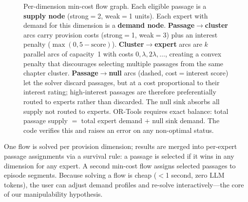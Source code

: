 \documentclass[final]{clv2025}
\begin{document}
\begin{figure}[t]
\caption{Per-dimension min-cost flow graph.  Each eligible passage is
  a \textbf{supply node} (strong${}={}$2, weak${}={}$1 units).  Each
  expert with demand for this dimension is a \textbf{demand node}.
  \textbf{Passage$\to$cluster} arcs carry provision costs
  (strong${}={}$1, weak${}={}$3) plus an interest penalty
  ($\max(0, 5 - \text{score})$).  \textbf{Cluster$\to$expert} arcs
  are $k$ parallel arcs of capacity~1 with costs $0, \lambda,
  2\lambda, \ldots$, creating a convex penalty that discourages
  selecting multiple passages from the same chapter cluster.
  \textbf{Passage$\to$null} arcs (dashed, cost${}={}$interest score)
  let the solver discard passages, but at a cost proportional to
  their interest rating; high-interest passages are therefore
  preferentially routed to experts rather than discarded.
  The null sink absorbs all supply not routed to experts.  OR-Tools requires exact balance: total
  passage supply $=$ total expert demand $+$ null sink demand.  The
  code verifies this and raises an error on any non-optimal status.}
\label{fig:flow}
\end{figure}

One flow is solved per provision dimension; results are merged into
per-expert passage assignments via a survival rule: a passage is
selected if it wins in any dimension for any expert.  A second
min-cost flow assigns selected passages to episode segments.  Because
solving a flow is cheap ($<$1 second, zero LLM tokens), the user can
adjust demand profiles and re-solve interactively---the core of our
manipulability hypothesis.
\end{document}
